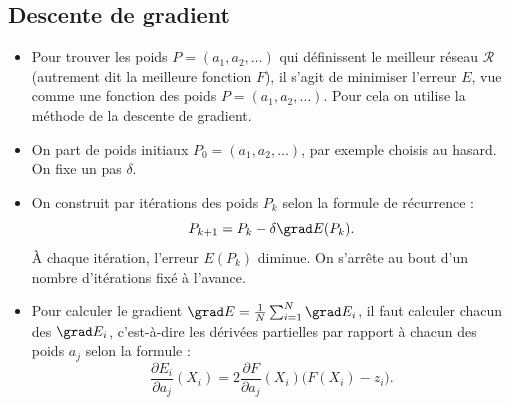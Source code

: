 \documentclass[11pt,class=report,crop=false]{standalone}
\begin{document}
\subsection{Descente de gradient}

\begin{itemize}
  \item Pour trouver les poids $P = (a_1,a_2,\ldots)$ qui définissent le meilleur réseau $\mathcal{R}$ (autrement dit la meilleure fonction $F$),
  il s'agit de minimiser l'erreur $E$, vue comme une fonction des poids $P = (a_1,a_2,\ldots)$. Pour cela on utilise la méthode de la descente de gradient.
  
  \item On part de poids initiaux $P_0 = (a_1,a_2,\ldots)$, par exemple choisis au hasard. On fixe un pas $\delta$.
  
  \item On construit par itérations des poids $P_k$ selon la formule de récurrence :
  $$P_{k+1} = P_k - \delta \grad E(P_k).$$
  \`A chaque itération, l'erreur $E(P_k)$ diminue.
  On s'arrête au bout d'un nombre d'itérations fixé à l'avance.
  
  \item Pour calculer le gradient $\grad E = \frac 1N \sum_{i=1}^N \grad E_i$, il faut  
  calculer chacun des $\grad E_i$, c'est-à-dire les dérivées partielles par rapport à chacun des poids $a_j$ selon la formule :
  $$\frac{\partial E_i}{\partial a_j}(X_i) = 2 \frac{\partial F}{\partial a_j}(X_i)  \big( F(X_i) - z_i \big).$$
\end{itemize}  
\end{document}
